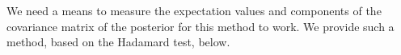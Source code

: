 \documentclass[aps,amsmath,onecolumn,amssymb]{revtex4}
\begin{document}

We need a means to measure the expectation values and components of the covariance matrix of the posterior for this method to work.  We provide such a method, based on the Hadamard test,  below.
\end{document}
